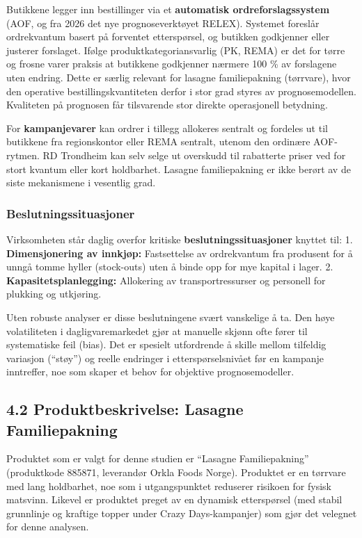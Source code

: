 \documentclass[
  norsk,
  11pt,
  a4paper,
]{article}
\begin{document}
Butikkene legger inn bestillinger via et \textbf{automatisk
ordreforslagssystem} (AOF, og fra 2026 det nye prognoseverktøyet RELEX).
Systemet foreslår ordrekvantum basert på forventet etterspørsel, og
butikken godkjenner eller justerer forslaget. Ifølge
produktkategoriansvarlig (PK, REMA) er det for tørre og frosne varer
praksis at butikkene godkjenner nærmere 100 \% av forslagene uten
endring. Dette er særlig relevant for lasagne familiepakning (tørrvare),
hvor den operative bestillingskvantiteten derfor i stor grad styres av
prognosemodellen. Kvaliteten på prognosen får tilsvarende stor direkte
operasjonell betydning.

For \textbf{kampanjevarer} kan ordrer i tillegg allokeres sentralt og
fordeles ut til butikkene fra regionskontor eller REMA sentralt, utenom
den ordinære AOF-rytmen. RD Trondheim kan selv selge ut overskudd til
rabatterte priser ved for stort kvantum eller kort holdbarhet. Lasagne
familiepakning er ikke berørt av de siste mekanismene i vesentlig grad.

\subsubsection{Beslutningssituasjoner}\label{beslutningssituasjoner}

Virksomheten står daglig overfor kritiske
\textbf{beslutningssituasjoner} knyttet til: 1. \textbf{Dimensjonering
av innkjøp:} Fastsettelse av ordrekvantum fra produsent for å unngå
tomme hyller (stock-outs) uten å binde opp for mye kapital i lager. 2.
\textbf{Kapasitetsplanlegging:} Allokering av transportressurser og
personell for plukking og utkjøring.

Uten robuste analyser er disse beslutningene svært vanskelige å ta. Den
høye volatiliteten i dagligvaremarkedet gjør at manuelle skjønn ofte
fører til systematiske feil (bias). Det er spesielt utfordrende å skille
mellom tilfeldig variasjon (``støy'') og reelle endringer i
etterspørselsnivået før en kampanje inntreffer, noe som skaper et behov
for objektive prognosemodeller.

\subsection{4.2 Produktbeskrivelse: Lasagne
Familiepakning}\label{produktbeskrivelse-lasagne-familiepakning}

Produktet som er valgt for denne studien er ``Lasagne Familiepakning''
(produktkode 885871, leverandør Orkla Foods Norge). Produktet er en
tørrvare med lang holdbarhet, noe som i utgangspunktet reduserer
risikoen for fysisk matsvinn. Likevel er produktet preget av en dynamisk
etterspørsel (med stabil grunnlinje og kraftige topper under Crazy
Days-kampanjer) som gjør det velegnet for denne analysen.
\end{document}
